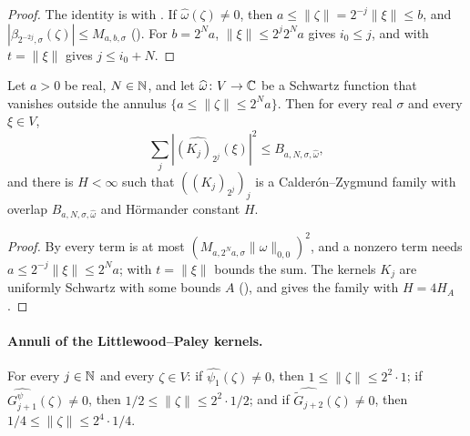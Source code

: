 \begin{proof}
\leanok
The identity is  with . If
$\widehat\omega(\zeta) \neq 0$, then $a \leq \|\zeta\| = 2^{-j} \|\xi\| \leq b$, and
$|\beta_{2^{-2j},\sigma}(\zeta)| \leq M_{a,b,\sigma}$ (). For
$b = 2^N a$, $\|\xi\| \leq 2^j 2^N a$ gives $i_0 \leq j$, and 
with $t = \|\xi\|$ gives $j \leq i_0 + N$.
\end{proof}

\begin{theorem}
\label{thm:cz-family-bessel}
\leanok
{}
Let $a > 0$ be real, $N \in \mathbb{N}$, and let $\widehat\omega \colon V \to \mathbb{C}$ be a Schwartz function
that vanishes outside the annulus $\{a \leq \|\zeta\| \leq 2^N a\}$. Then for every real $\sigma$
and every $\xi \in V$,
\[
  \sum_j |\widehat{(K_j)_{2^j}}(\xi)|^2 \leq B_{a,N,\sigma,\widehat\omega} ,
\]
and there is $H < \infty$ such that $((K_j)_{2^j})_j$ is a Calder\'on--Zygmund family with
overlap $B_{a,N,\sigma,\widehat\omega}$ and H\"ormander constant $H$.
\end{theorem}

\begin{proof}
\leanok
By  every term is at most
$(M_{a,2^N a,\sigma} \|\widehat\omega\|_{0,0})^2$, and a nonzero term needs
$a \leq 2^{-j} \|\xi\| \leq 2^N a$;  with $t = \|\xi\|$ bounds the
sum. The kernels $K_j$
are uniformly Schwartz with some bounds $A$ (), and
 gives the family with $H = 4 H_A$.
\end{proof}

\paragraph{Annuli of the Littlewood--Paley kernels.}

\begin{lemma}
\label{lem:littlewood-paley-annuli}
\leanok
{}
For every $j \in \mathbb{N}$ and every $\zeta \in V$:
if $\widehat{\psi_1}(\zeta) \neq 0$, then $1 \leq \|\zeta\| \leq 2^2 \cdot 1$; if
$\widehat{G^{\psi}_{j+1}}(\zeta) \neq 0$, then $1/2 \leq \|\zeta\| \leq 2^2 \cdot 1/2$; and if
$\widehat{\tilde G_{j+2}}(\zeta) \neq 0$, then $1/4 \leq \|\zeta\| \leq 2^4 \cdot 1/4$.
\end{lemma}

